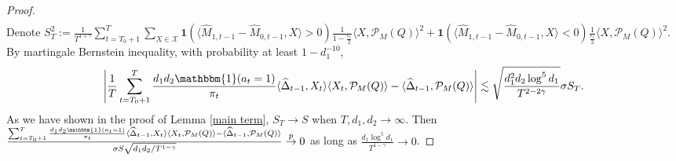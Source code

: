 \documentclass[12pt]{article}
\newcommand{\inp}[2]{\langle #1,#2\rangle}
\def\indicator{\mathbf{1}}
\theoremstyle{plain}
\begin{document}
\begin{proof}
\begin{align*}
    \end{align*}
    Denote $S_T^2:=\frac{1}{T^{1+\gamma}}\sum_{t=T_0+1}^{T} \sum_{X\in \mathcal{X}} \indicator(\inp{\widehat{M}_{1,t-1}-\widehat{M}_{0,t-1}}{X}>0)\frac{1}{1-\frac{\varepsilon_t}{2}}\inp{X}{\mathcal{P}_M(Q)}^2  +  \indicator(\inp{\widehat{M}_{1,t-1}-\widehat{M}_{0,t-1}}{X}<0)\frac{1}{\frac{\varepsilon_t}{2}}\inp{X}{\mathcal{P}_M(Q)}^2$. By martingale Bernstein inequality, with probability at least $1-d_1^{-10}$,
    \begin{align*}
        \left|\frac{1}{T}\sum_{t=T_0+1}^{T}\frac{d_1d_2\mathbbm{1}(a_t=1)}{\pi_t}\inp{\widehat{\Delta}_{t-1}}{X_t}\inp{X_t}{\mathcal{P}_M(Q)}-\inp{\widehat{\Delta}_{t-1}}{\mathcal{P}_M(Q)}\right|\lesssim \sqrt{\frac{d_1^2d_2\log^5 d_1}{T^{2-2\gamma}}}\sigma S_T.
    \end{align*}
    As we have shown in the proof of Lemma \ref{main term}, $S_T\rightarrow S$ when $T,d_1,d_2\rightarrow \infty$. Then \\ $\frac{\sum_{t=T_0+1}^{T}\frac{d_1d_2\mathbbm{1}(a_t=1)}{\pi_t}\inp{\widehat{\Delta}_{t-1}}{X_t}\inp{X_t}{\mathcal{P}_M(Q)}-\inp{\widehat{\Delta}_{t-1}}{\mathcal{P}_M(Q)}}{\sigma S\sqrt{d_1d_2/T^{1-\gamma}}}\overset{p}{\rightarrow} 0$ as long as $\frac{d_1\log^5d_1}{T^{1-\gamma}}\rightarrow 0$.
\end{proof}
\end{document}

